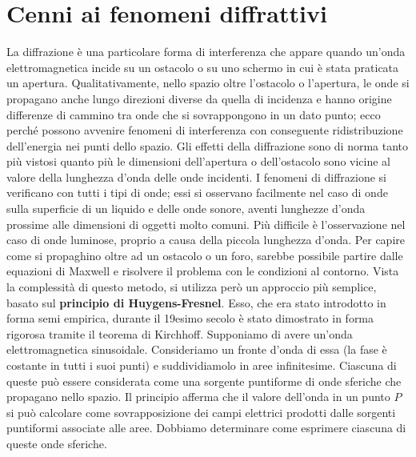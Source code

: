 \section{Cenni ai fenomeni diffrattivi}

La diffrazione è una particolare forma di interferenza che appare quando un'onda elettromagnetica incide su un ostacolo o su uno schermo in cui è stata praticata un apertura. Qualitativamente, nello spazio oltre l'ostacolo o l'apertura, le onde si propagano anche lungo direzioni diverse da quella di incidenza e hanno origine differenze di cammino tra onde che si sovrappongono in un dato punto; ecco perché possono avvenire fenomeni di interferenza con conseguente ridistribuzione dell'energia nei punti dello spazio. Gli effetti della diffrazione sono di norma tanto più vistosi quanto più le dimensioni dell'apertura o dell'ostacolo sono vicine al valore della lunghezza d'onda delle onde incidenti. I fenomeni di diffrazione si verificano con tutti i tipi di onde; essi si osservano facilmente nel caso di onde sulla superficie di un liquido e delle onde sonore, aventi lunghezze d'onda prossime alle dimensioni di oggetti molto comuni. Più difficile è l'osservazione nel caso di onde luminose, proprio a causa della piccola lunghezza d'onda. Per capire come si propaghino oltre ad un ostacolo o un foro, sarebbe possibile partire dalle equazioni di Maxwell e risolvere il problema con le condizioni al contorno. Vista la complessità di questo metodo, si utilizza però un approccio più semplice, basato sul \textbf{principio di Huygens-Fresnel}. Esso, che era stato introdotto in forma semi empirica, durante il 19esimo secolo è stato dimostrato in forma rigorosa tramite il teorema di Kirchhoff. Supponiamo di avere un'onda elettromagnetica sinusoidale. Consideriamo un fronte d'onda di essa (la fase è costante in tutti i suoi punti) e suddividiamolo in aree infinitesime. Ciascuna di queste può essere considerata come una sorgente puntiforme di onde sferiche che propagano nello spazio. Il principio afferma che il valore dell'onda in un punto $P$ si può calcolare come sovrapposizione dei campi elettrici prodotti dalle sorgenti puntiformi associate alle aree. Dobbiamo determinare come esprimere ciascuna di queste onde sferiche.

